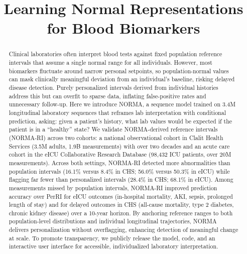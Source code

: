 \documentclass[11pt]{article}
\title{Learning Normal Representations for Blood Biomarkers}
\date{}
\begin{document}
\maketitle


\begin{abstract}
Clinical laboratories often interpret blood tests against fixed population reference intervals that assume a single normal range for all individuals. However, most biomarkers fluctuate around narrow personal setpoints, so population-normal values can mask clinically meaningful deviation from an individual's baseline, risking delayed disease detection. Purely personalized intervals derived from individual histories address this but can overfit to sparse data, inflating false-positive rates and unnecessary follow-up. Here we introduce NORMA, a sequence model trained on 3.4M longitudinal laboratory sequences that reframes lab interpretation with conditional prediction, asking: given a patient's history, what lab values would be expected if the patient is in a ``healthy'' state? We validate NORMA-derived reference intervals (NORMA-RI) across two cohorts: a national observational cohort in Clalit Health Services (3.5M adults, 1.9B measurements) with over two decades and an acute care cohort in the eICU Collaborative Research Database (98,432 ICU patients, over 20M measurements). Across both settings, NORMA-RI detected more abnormalities than population intervals (16.1\% versus 8.4\% in CHS; 56.0\% versus 50.3\% in eICU) while flagging far fewer than personalized intervals (28.4\% in CHS; 68.1\% in eICU). Among measurements missed by population intervals, NORMA-RI improved prediction accuracy over PerRI for eICU outcomes (in-hospital mortality, AKI, sepsis, prolonged length of stay) and for delayed outcomes in CHS (all-cause mortality, type 2 diabetes, chronic kidney disease) over a 10-year horizon. By anchoring reference ranges to both population-level distributions and individual longitudinal trajectories, NORMA delivers personalization without overflagging, enhancing detection of meaningful change at scale. To promote transparency, we publicly release the model, code, and an interactive user interface for accessible, individualized laboratory interpretation.
\end{abstract}

\clearpage

\end{document}
